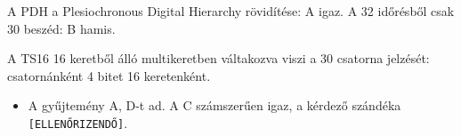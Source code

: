 A PDH a Plesiochronous Digital Hierarchy rövidítése: A igaz. A 32 időrésből csak 30 beszéd: B hamis.



\begin{center}\end{center}

A TS16 16 keretből álló multikeretben váltakozva viszi a 30 csatorna jelzését: csatornánként 4 bitet 16 keretenként.

\begin{center}\end{center}
\begin{eredmeny}

\begin{center}\end{center}
\end{eredmeny}
\begin{tipp}[Ellenőrzés]
\begin{itemize}
\item A gyűjtemény A, D-t ad. A C számszerűen igaz, a kérdező szándéka \texttt{[ELLENŐRIZENDŐ]}.
\end{itemize}
\end{tipp}
